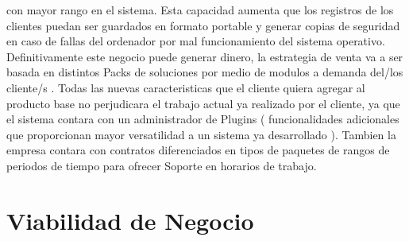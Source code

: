 \documentclass[
10pt, %
a4paper, %
oneside, %
headinclude,footinclude, %
BCOR5mm, %
]{scrartcl}
\begin{document}
con mayor rango en el sistema. Esta capacidad aumenta que los registros
de los clientes puedan ser guardados en formato portable y generar copias de
seguridad en caso de fallas del ordenador por mal funcionamiento del
sistema operativo.
\newline\newline
Definitivamente este negocio puede generar dinero, la estrategia de venta
va a ser basada en distintos Packs de soluciones por medio de modulos
a demanda del/los cliente/s . Todas las nuevas caracteristicas que el cliente
quiera agregar al producto base no perjudicara el trabajo actual ya realizado
por el cliente, ya que el sistema contara con un administrador de
Plugins ( funcionalidades adicionales que proporcionan mayor versatilidad a un
sistema ya desarrollado ).
Tambien la empresa contara con contratos diferenciados en tipos de paquetes de
rangos de periodos de tiempo para ofrecer Soporte en horarios de trabajo.

\section {Viabilidad de Negocio}
\end{document}
